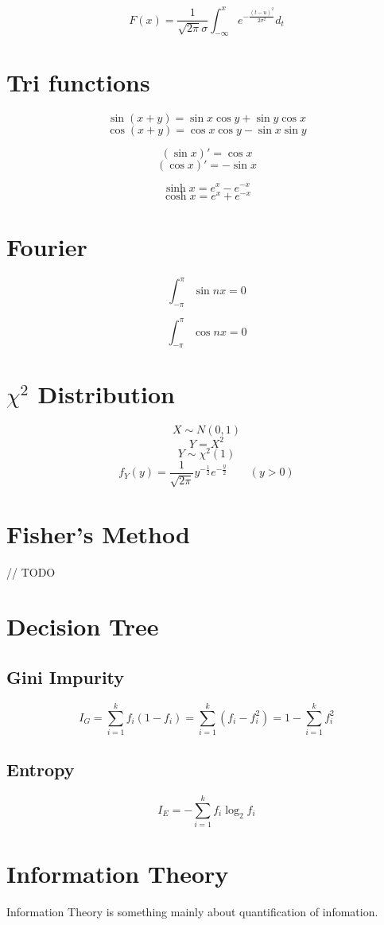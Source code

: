 \documentclass[twocolumn]{article}
\begin{document}
\[F(x) = \frac{1}{\sqrt{2\pi}\sigma}\int_{-\infty}^x e^{-\frac{(t-u)^2}{2\sigma^2}}d_t \]

\section{Tri functions}
\[\sin (x+y) = \sin x\cos y + \sin y\cos x\]
\[\cos (x+y) = \cos x\cos y - \sin x\sin y\]

\[(\sin x)' = \cos x\]
\[(\cos x)' = -\sin x\]

\[\sinh x = e^x - e^{-x}\]
\[\cosh x = e^x + e^{-x}\]

\section{Fourier}

\[\int_{-\pi}^{\pi} \sin nx = 0\]

\[\int_{-\pi}^{\pi} \cos nx = 0\]

\section{$\chi^2$ Distribution}
\[X \sim N(0,1)\]
\[Y = X^2\]
\[Y \sim \chi^2(1)\]
\[f_Y(y) = \frac{1}{\sqrt{2\pi}}y^{-\frac{1}{2}}e^{-\frac{y}{2}}\qquad (y>0)\]


\section{Fisher's Method}
// TODO

\section{Decision Tree}
\subsection{Gini Impurity}
\[I_G = \sum_{i=1}^k f_i(1-f_i) = \sum_{i=1}^k (f_i - f_i^2) = 1 - \sum_{i=1}^k f_i^2\]

\subsection{Entropy}
\[I_E = -\sum_{i=1}^k f_i\log_2{f_i}\]

\section{Information Theory}
Information Theory is something mainly about quantification of infomation.
\end{document}
